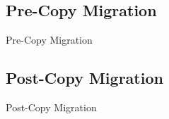 	\subsection{Pre-Copy Migration}

		\begin{frame}[fragile]{Pre-Copy Migration}
		\end{frame}

	\subsection{Post-Copy Migration}

		\begin{frame}[fragile]{Post-Copy Migration}
		\end{frame}

